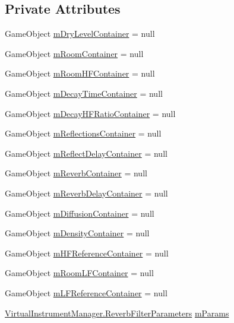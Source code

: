 \subsection*{Private Attributes}
\begin{DoxyCompactItemize}
\item 
Game\+Object \hyperlink{class_a_t_i___reverb_filter_handler_a1373be0e7de8911f4e95f10289117389}{m\+Dry\+Level\+Container} = null
\item 
Game\+Object \hyperlink{class_a_t_i___reverb_filter_handler_aba031a396792257ab91bd8fc56a3c402}{m\+Room\+Container} = null
\item 
Game\+Object \hyperlink{class_a_t_i___reverb_filter_handler_a87b996d08d23419b6403347ca0316daf}{m\+Room\+H\+F\+Container} = null
\item 
Game\+Object \hyperlink{class_a_t_i___reverb_filter_handler_a797cdcbb421ba074802a553047cce07e}{m\+Decay\+Time\+Container} = null
\item 
Game\+Object \hyperlink{class_a_t_i___reverb_filter_handler_a747b42c6663dae5892048cc714677101}{m\+Decay\+H\+F\+Ratio\+Container} = null
\item 
Game\+Object \hyperlink{class_a_t_i___reverb_filter_handler_a03319a2f6cc8e26f074789fb525584e7}{m\+Reflections\+Container} = null
\item 
Game\+Object \hyperlink{class_a_t_i___reverb_filter_handler_a8344d44e118de9b321cdf0b84a383f89}{m\+Reflect\+Delay\+Container} = null
\item 
Game\+Object \hyperlink{class_a_t_i___reverb_filter_handler_a8af547f0f1c566b57439d4ec5ce244b4}{m\+Reverb\+Container} = null
\item 
Game\+Object \hyperlink{class_a_t_i___reverb_filter_handler_affa45d12ae5c3f25f8662fca54dc6bbe}{m\+Reverb\+Delay\+Container} = null
\item 
Game\+Object \hyperlink{class_a_t_i___reverb_filter_handler_a68deedceca43c3fc45ee80912e4c8fa7}{m\+Diffusion\+Container} = null
\item 
Game\+Object \hyperlink{class_a_t_i___reverb_filter_handler_a1668ae518533eee4658e3bc65e377491}{m\+Density\+Container} = null
\item 
Game\+Object \hyperlink{class_a_t_i___reverb_filter_handler_a45c18f64f4e32e59580246305ba785ae}{m\+H\+F\+Reference\+Container} = null
\item 
Game\+Object \hyperlink{class_a_t_i___reverb_filter_handler_ab29f45ffbe20f9f44305f3f009c8fa6b}{m\+Room\+L\+F\+Container} = null
\item 
Game\+Object \hyperlink{class_a_t_i___reverb_filter_handler_ae9010ffdcbb124b62027df7d31feeecb}{m\+L\+F\+Reference\+Container} = null
\item 
\hyperlink{group__filter_params_struct_virtual_instrument_manager_1_1_reverb_filter_parameters}{Virtual\+Instrument\+Manager.\+Reverb\+Filter\+Parameters} \hyperlink{class_a_t_i___reverb_filter_handler_a034260fbce2052b42bceddc891632347}{m\+Params}
\end{DoxyCompactItemize}
